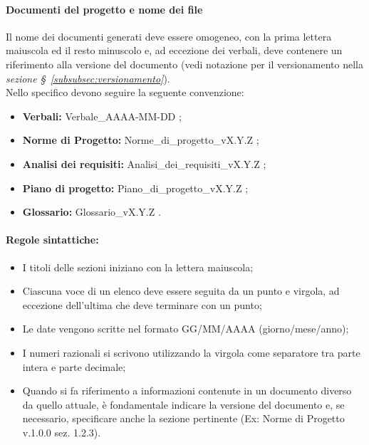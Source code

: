 \paragraph*{Documenti del progetto e nome dei file}\label{sec:NomeFile}
Il nome dei documenti generati deve essere omogeneo, con la prima lettera maiuscola ed il resto minuscolo e, ad eccezione dei verbali, deve contenere un riferimento alla versione del documento (vedi notazione per il versionamento nella \textit{sezione \S~\ref{subsubsec:versionamento}}). \\
Nello specifico devono seguire la seguente convenzione:
\begin{itemize}
    \item \textbf{Verbali:} Verbale\_AAAA-MM-DD ;
    \item \textbf{Norme di Progetto:} Norme\_di\_progetto\_vX.Y.Z ;
    \item \textbf{Analisi dei requisiti:} Analisi\_dei\_requisiti\_vX.Y.Z ;
    \item \textbf{Piano di progetto:} Piano\_di\_progetto\_vX.Y.Z ;
    \item \textbf{Glossario:} Glossario\_vX.Y.Z .
\end{itemize}

\paragraph*{Regole sintattiche:}
\begin{itemize}
    \item I titoli delle sezioni iniziano con la lettera maiuscola;
    \item Ciascuna voce di un elenco deve essere seguita da un punto e virgola, ad eccezione dell'ultima che deve terminare con un punto;
    \item Le date vengono scritte nel formato GG/MM/AAAA (giorno/mese/anno);
    \item I numeri razionali si scrivono utilizzando la virgola come separatore tra parte intera e parte decimale;
    \item Quando si fa riferimento a informazioni contenute in un documento diverso da quello attuale, è fondamentale indicare la versione del documento e, se necessario, specificare anche la sezione pertinente (Ex: Norme di Progetto v.1.0.0 sez. 1.2.3).
\end{itemize}

